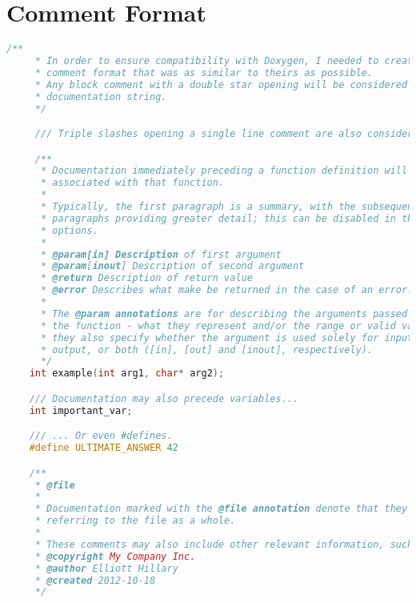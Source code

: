 \chapter{Comment Format}

\begin{lstlisting}[language=c]
    /**
     * In order to ensure compatibility with Doxygen, I needed to create a
     * comment format that was as similar to theirs as possible.
     * Any block comment with a double star opening will be considered for a
     * documentation string.
     */

     /// Triple slashes opening a single line comment are also considered.

     /**
      * Documentation immediately preceding a function definition will become
      * associated with that function.
      *
      * Typically, the first paragraph is a summary, with the subsequent
      * paragraphs providing greater detail; this can be disabled in the
      * options.
      *
      * @param[in] Description of first argument
      * @param[inout] Description of second argument
      * @return Description of return value
      * @error Describes what make be returned in the case of an error.
      *
      * The @param annotations are for describing the arguments passed into
      * the function - what they represent and/or the range or valid values -
      * they also specify whether the argument is used solely for input,
      * output, or both ([in], [out] and [inout], respectively).
      */
    int example(int arg1, char* arg2);

    /// Documentation may also precede variables...
    int important_var;

    /// ... Or even #defines.
    #define ULTIMATE_ANSWER 42

    /**
     * @file
     *
     * Documentation marked with the @file annotation denote that they are
     * referring to the file as a whole.
     *
     * These comments may also include other relevant information, such as:
     * @copyright My Company Inc.
     * @author Elliott Hillary
     * @created 2012-10-18
     */
\end{lstlisting}
